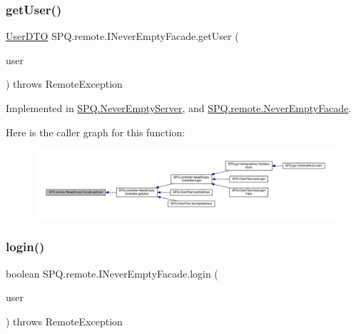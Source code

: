 \subsubsection{\texorpdfstring{get\+User()}{getUser()}}
{\footnotesize\ttfamily \mbox{\hyperlink{class_s_p_q_1_1dto_1_1_user_d_t_o}{User\+D\+TO}} S\+P\+Q.\+remote.\+I\+Never\+Empty\+Facade.\+get\+User (\begin{DoxyParamCaption}\item[{\mbox{\hyperlink{class_s_p_q_1_1dto_1_1_user_d_t_o}{User\+D\+TO}}}]{user }\end{DoxyParamCaption}) throws Remote\+Exception}



Implemented in \mbox{\hyperlink{class_s_p_q_1_1_never_empty_server_abb18bd0d72ecb8790068f206c592c58d}{S\+P\+Q.\+Never\+Empty\+Server}}, and \mbox{\hyperlink{class_s_p_q_1_1remote_1_1_never_empty_facade_a32679a25e12c8a33e84087de357cd616}{S\+P\+Q.\+remote.\+Never\+Empty\+Facade}}.

Here is the caller graph for this function\+:
\nopagebreak
\begin{figure}[H]
\begin{center}
\leavevmode
\includegraphics[width=350pt]{interface_s_p_q_1_1remote_1_1_i_never_empty_facade_aa329dfc23ab0832e73802bf2df90b9e0_icgraph}
\end{center}
\end{figure}
\mbox{\label{interface_s_p_q_1_1remote_1_1_i_never_empty_facade_a2440fa36695c63e4e4c30fc25965f853}} 
\subsubsection{\texorpdfstring{login()}{login()}}
{\footnotesize\ttfamily boolean S\+P\+Q.\+remote.\+I\+Never\+Empty\+Facade.\+login (\begin{DoxyParamCaption}\item[{\mbox{\hyperlink{class_s_p_q_1_1dto_1_1_user_d_t_o}{User\+D\+TO}}}]{user }\end{DoxyParamCaption}) throws Remote\+Exception}



